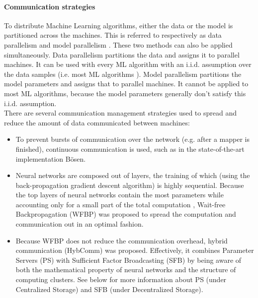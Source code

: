 \paragraph{Communication strategies}
To distribute Machine Learning algorithms, either the data or the model is partitioned across the machines. This is referred to respectively as data parallelism and model parallelism \cite{Die12}. These two methods can also be applied simultaneously\cite{Xing16}. Data parallelism partitions the data and assigns it to parallel machines. It can be used with every ML algorithm with an i.i.d. assumption over the data samples (i.e. most ML algorithms \cite{Xing16}). Model parallelism partitions the model parameters and assigns that to parallel machines. It cannot be applied to most ML algorithms, because the model parameters generally don't satisfy this i.i.d. assumption.\\
There are several communication management strategies\cite{Xing16} used to spread and reduce the amount of data communicated between machines:
\begin{itemize}
	\item To prevent bursts of communication over the network (e.g. after a mapper is finished), continuous communication is used, such as in the state-of-the-art implementation B\"osen\cite{Wei15}.
	
	\item Neural networks are composed out of layers, the training of which (using the back-propagation gradient descent algorithm) is highly sequential. Because the top layers of neural networks contain the most parameters while accounting only for a small part of the total computation \cite{Xing16}, Wait-free Backpropagation (WFBP) \cite{Zhang17} was proposed to spread the computation and communication out in an optimal fashion.
	
	\item Because WFBP does not reduce the communication overhead, hybrid communication (HybComm) \cite{Zhang17} was proposed. Effectively, it combines Parameter Servers (PS)\cite{Wei15} with Sufficient Factor Broadcasting (SFB)\cite{Xie15} by being aware of both the mathematical property of neural networks and the structure of computing clusters. See below for more information about PS (under Centralized Storage) and SFB (under Decentralized Storage).
	
\end{itemize}


